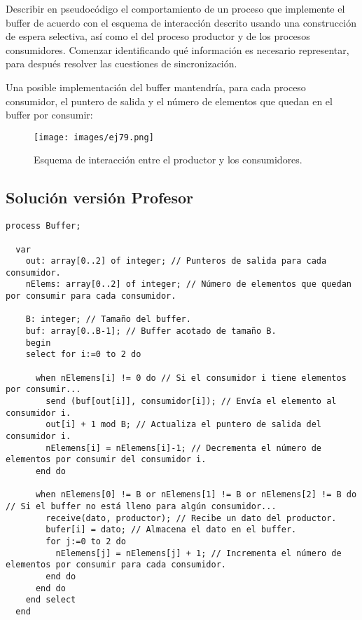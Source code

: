 \documentclass[a4paper,12pt]{article}
\begin{document}
Describir en pseudocódigo el comportamiento de un proceso que implemente el buffer de acuerdo con el esquema de interacción descrito usando una construcción de espera selectiva, así como el del proceso productor y de los procesos consumidores. Comenzar identificando qué información es necesario representar, para después resolver las cuestiones de sincronización. 

Una posible implementación del buffer mantendría, para cada proceso consumidor, el puntero de salida y el número de elementos que quedan en el buffer por consumir:

\begin{figure}[H]
  \centering
  \texttt{[image: images/ej79.png]}
  \caption{Esquema de interacción entre el productor y los consumidores.}
  \label{fig:ejercicio79}
\end{figure}

\subsection{Solución versión Profesor}

\begin{lstlisting}[style=customcpp, caption={Pseudocódigo del proceso Buffer}]
  process Buffer;

  var
    out: array[0..2] of integer; // Punteros de salida para cada consumidor.
    nElems: array[0..2] of integer; // Número de elementos que quedan por consumir para cada consumidor.
    
    B: integer; // Tamaño del buffer.
    buf: array[0..B-1]; // Buffer acotado de tamaño B.
    begin
    select for i:=0 to 2 do 
      
      when nElemens[i] != 0 do // Si el consumidor i tiene elementos por consumir...
        send (buf[out[i]], consumidor[i]); // Envía el elemento al consumidor i.
        out[i] + 1 mod B; // Actualiza el puntero de salida del consumidor i.
        nElemens[i] = nElemens[i]-1; // Decrementa el número de elementos por consumir del consumidor i.
      end do
      
      when nElemens[0] != B or nElemens[1] != B or nElemens[2] != B do // Si el buffer no está lleno para algún consumidor...
        receive(dato, productor); // Recibe un dato del productor.
        bufer[i] = dato; // Almacena el dato en el buffer.
        for j:=0 to 2 do
          nElemens[j] = nElemens[j] + 1; // Incrementa el número de elementos por consumir para cada consumidor.
        end do
      end do
    end select
  end
\end{lstlisting}
\end{document}
